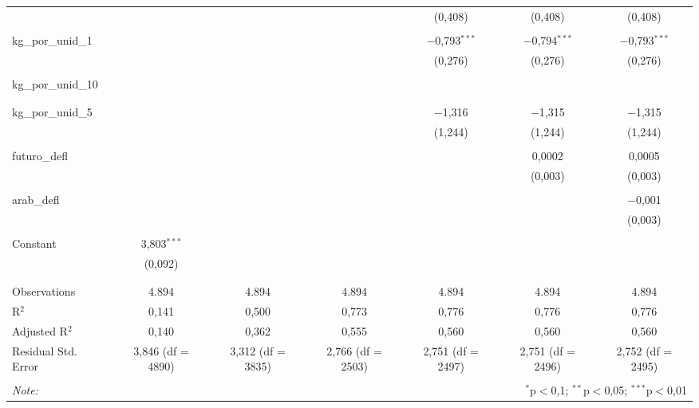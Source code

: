 \begin{table}[!htbp]
\begin{tabular}{@{\extracolsep{5pt}}lcccccc}
  &  &  &  & (0,408) & (0,408) & (0,408) \\ 
  & & & & & & \\ 
 kg\_por\_unid\_1 &  &  &  & $-$0,793$^{***}$ & $-$0,794$^{***}$ & $-$0,793$^{***}$ \\ 
  &  &  &  & (0,276) & (0,276) & (0,276) \\ 
  & & & & & & \\ 
 kg\_por\_unid\_10 &  &  &  &  &  &  \\ 
  &  &  &  &  &  &  \\ 
  & & & & & & \\ 
 kg\_por\_unid\_5 &  &  &  & $-$1,316 & $-$1,315 & $-$1,315 \\ 
  &  &  &  & (1,244) & (1,244) & (1,244) \\ 
  & & & & & & \\ 
 futuro\_defl &  &  &  &  & 0,0002 & 0,0005 \\ 
  &  &  &  &  & (0,003) & (0,003) \\ 
  & & & & & & \\ 
 arab\_defl &  &  &  &  &  & $-$0,001 \\ 
  &  &  &  &  &  & (0,003) \\ 
  & & & & & & \\ 
 Constant & 3,803$^{***}$ &  &  &  &  &  \\ 
  & (0,092) &  &  &  &  &  \\ 
  & & & & & & \\ 
\hline \\[-1.8ex] 
Observations & 4.894 & 4.894 & 4.894 & 4.894 & 4.894 & 4.894 \\ 
R$^{2}$ & 0,141 & 0,500 & 0,773 & 0,776 & 0,776 & 0,776 \\ 
Adjusted R$^{2}$ & 0,140 & 0,362 & 0,555 & 0,560 & 0,560 & 0,560 \\ 
Residual Std. Error & 3,846 (df = 4890) & 3,312 (df = 3835) & 2,766 (df = 2503) & 2,751 (df = 2497) & 2,751 (df = 2496) & 2,752 (df = 2495) \\ 
\hline 
\hline \\[-1.8ex] 
\textit{Note:}  & \multicolumn{6}{r}{$^{*}$p$<$0,1; $^{**}$p$<$0,05; $^{***}$p$<$0,01} \\ 
\end{tabular} 
\end{table} 
